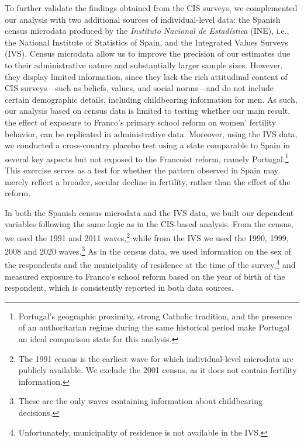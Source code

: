 \documentclass[a4paper,oneside,final,onecolumn,12pt,english]{article}
\begin{document}
To further validate the findings obtained from the CIS surveys, we complemented our analysis with two additional sources of individual-level data: the Spanish census microdata produced by the \textit{Instituto Nacional de Estadística} (INE), i.e., the National Institute of Statistics of Spain, and the Integrated Values Surveys (IVS). %
 Census microdata allow us to improve the precision of our estimates due to their administrative nature and substantially larger sample sizes. However, they display limited information, since they lack the rich attitudinal content of CIS surveys—such as beliefs, values, and social norms—and do not include certain demographic details, including childbearing information for men. As such, our analysis based on census data is limited to testing whether our main result, the effect of exposure to Franco’s primary school reform on women' fertility behavior, can be replicated in administrative data. Moreover, using the IVS data, we conducted a cross-country placebo test using a state comparable to Spain in several key aspects but not exposed to the Francoist reform, namely Portugal.\footnote{Portugal's geographic proximity, strong Catholic tradition, and the presence of an authoritarian regime during the same historical period make Portugal an ideal comparison state for this analysis.} This exercise serves as a test for whether the pattern observed in Spain may merely reflect a broader, secular decline in fertility, rather than the effect of the reform.

In both the Spanish census microdata and the IVS data, we built our dependent variables following the same logic as in the CIS-based analysis. From the census, we used the 1991 and 2011 waves,\footnote{The 1991 census is the earliest wave for which individual-level microdata are publicly available. We exclude the 2001 census, as it does not contain fertility information.} while from the IVS we used the 1990, 1999, 2008 and 2020 waves.\footnote{These are the only waves containing information about childbearing decisions.} As in the census data, we used information on the sex of the respondents and the municipality of residence at the time of the survey,\footnote{Unfortunately, municipality of residence is not available in the IVS.} and measured exposure to Franco's school reform based on the year of birth of the respondent, which is consistently reported in both data sources.
\end{document}
